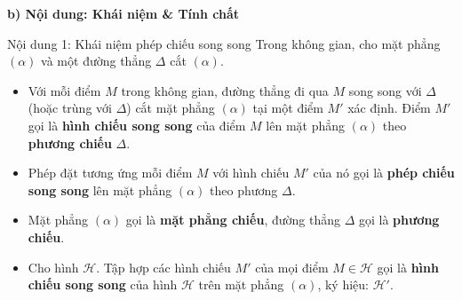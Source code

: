 \documentclass[12pt, a4paper]{article}
\begin{document}
\noindent \textbf{b) Nội dung: Khái niệm \& Tính chất}
\begin{pedabox}{Nội dung 1: Khái niệm phép chiếu song song}
Trong không gian, cho mặt phẳng $(\alpha)$ và một đường thẳng $\Delta$ cắt $(\alpha)$.
\begin{center}
\end{center}
\begin{itemize}[leftmargin=0.6cm]
    \item Với mỗi điểm $M$ trong không gian, đường thẳng đi qua $M$ song song với $\Delta$ (hoặc trùng với $\Delta$) cắt mặt phẳng $(\alpha)$ tại một điểm $M'$ xác định. Điểm $M'$ gọi là \textbf{hình chiếu song song} của điểm $M$ lên mặt phẳng $(\alpha)$ theo \textbf{phương chiếu} $\Delta$.
    \item Phép đặt tương ứng mỗi điểm $M$ với hình chiếu $M'$ của nó gọi là \textbf{phép chiếu song song} lên mặt phẳng $(\alpha)$ theo phương $\Delta$.
    \item Mặt phẳng $(\alpha)$ gọi là \textbf{mặt phẳng chiếu}, đường thẳng $\Delta$ gọi là \textbf{phương chiếu}.
    \item Cho hình $\mathscr{H}$. Tập hợp các hình chiếu $M'$ của mọi điểm $M \in \mathscr{H}$ gọi là \textbf{hình chiếu song song} của hình $\mathscr{H}$ trên mặt phẳng $(\alpha)$, ký hiệu: $\mathscr{H}'$.
\end{itemize}
\end{pedabox}
\end{document}
